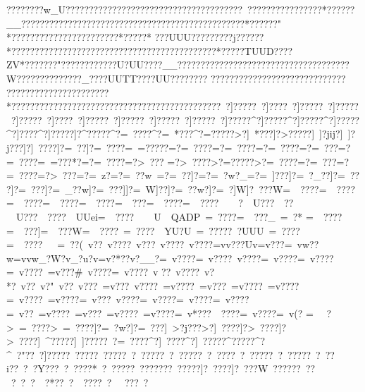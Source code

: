 {{{{{{{{{{{{{{{{{{{{{{{{{{{{{{{{{{{{{{{{{{{{{{{{{{{{{{{{{{{{{{{{{{{{{{{{{{{{{{{{{{{{{{{{{{{{{{{{{{{{{{{{{{{{{{{{{{{{{{{{{{{{{{{{{{{{{{{{{{{{{{{{{{{{{{{{{{{{{{{{{{{{{{{{{{{{{{{{{{{{{{{{{{{{{{{{{{{{{{{{{{{{{{{{{{{{{{{{{{{{{{{{{{{{{{{{{{{{{{{{{{{{{{{{{{{{{{{{{{{{{{{{{{{{{{{{{{{{{{{{{{{{{{{{{{{{{{{{{{{{{{{{{{{{{{{{{{{{{{{{{{{{{{{{{{{{{{{{{{{{{{{{{{{{{{{{{{{{{{{{{{{{{{{{{{{{{{{{{{{{{{{{{{{{{{{{{{{{{{{{{{{{{{{{{{{{{{{{{{{{{{{{{{{{{{{{{{{{{{{{{{{{{{{{{{{{{{{{{{{{{{{{{{{{{{{{{{{{{{{{{{{{{{{{{{{{{{{{{{{{{{{{{{{{{{{{{{{{{{{{{{{{{{{{{{{{{{{{{{{{{{{{{{{{{{{{{{{{{{{{{{{{{{{{{{{{{{{{{{{{{{{{{{{{{{{{{{{{{{{{{{{{{{{{{{{{{{{{{{{{{{{{{{{{{{{{{{{{{{{{{{{{{{{{{{{{{{{{{{{{{{{{{{{{{{{{{{{{{{{{{{{{{{{{{{{{{{{{{{{{{{{{{{{{{{{{{{{{{{{{{{{{{{{{{{{{{{{{{{{{{{{{{{{{{{{{{{{{{{{{{{{{{{{{{{{{{{{{{{{{{{{{{{{{{{{{{{{{{{{{{{{{{{{{{{{{{{{{{{{{{{{{{{{{{{{{{{{{{{{{{{{{{{{{{{{{{{{{{{{{{{{{{{{{{{{{{{{{{{{{{{{{{{{{{{{{{{{{{{{{{{{{{{{{{{{{{{{{{{{{{{{{{{{{{{{{{{{{{{{{{{{{{{{{{{{{{{{{{{{{{{{{{{{{{{{{{{{{{{{{{{{{{{{{{{{{{{{{{{{{{{{{{{{{{{{{{{{{{{{{{{{{{{{{{{{{{{{{{{{{{{{{{{{{{{{{{{{{{{{{{{{{{{{{{{{{{{{{{{{{{{{{{{{{{{{{{{{{{{{{{{{{{{{{{{{{{{{{{{{{{{{{{{{{{{{{{{{{{{{{{{{{{{{{{{{{{{{{{{{{{{{{{{{{{{{{{{{{{{{{{{{{{{{{{{{{{{{{{{{{{{{{{{{{{{{{{{{{????????w_U??????????????????????????????????????~????????????????*??????__????????????????????????????????????????????????*??????"
*???????????????????????*?????  *
???UUU?????????j??????
*????????????????????????????????????????????*?????TUUD????ZV*???????"????????????U?UU????__???????}??????????????????????????????W??????????????_????UUTT????UU????    ???? ????????????????????????????? ??????????????????????*?????????????????????????????????????????????~?]?????~?]????~?]?????~?]?????~?]?????~?]????~?]?????~?]?????~?]?????~?]?????~?]?????^?]?????^?]?????^?]?????^?]????^?]?????]?^?????^?=~????^?=~*???^?=?????>?]~*???]?>?????]~]?jij?]~]?j???]?]~????]?=~??]?=~????=~=?????=?=~????=?=~????=?=~????=?=~???=?=~????=~=???*?=?=~????=?>~???
=?>~????>?=?????>?=~????=?=~???=?=~????=?>~???=?=~z?=?=~??w~=?=~??]?=?=~?w?_=?=~]???]?=~?_??]?=~???]?=~???]?=~_??w]?=~???]]?=~W]??]?=~??w?]?=~?]W]?~???W=~~????=~~????=~~????=~~????=~~????=~~???=~~????=~~????~~    ~~?   ~~U???~~??  ~~U???~~????~~UUei=~~????~~    ~~U~~QADP~=~????=~~???_~=~?*
 =~~????=~~???]=~~???W=~~????~=~????~~YU?U~=~?????~?UUU~=~????=~~????~~    ~=~??(~v ?? ~v????~v???~v????~v????=vv???Uv=v???=~vw??w=vvw_?W?}v_?u?v=v?*??}v?__?=~v????=~v????~v????=~v????=~v????=~v????~=v???#~v????=~v????~v
??~v????~v?*?~v??~v?"~v??~v???~=v???~v????~=v????~=v???~=v????~=v????=~v????~=v????=~v???~v????=~v????=~v????=~v????=~v??~=v????~=v???~=v????~=v????=~v*???~~????=~v????=~v( ?
=~~
 ?>~=~????>~=~????]?=~}?w?]?=~???]~>?j???>?]~????]?>~????]?>~????]~^?????]~]?????~?=~????^?]~????^?]~????}?^?????^?^~?"??~?]?????~?}???}?~?????~?~?????~?~?????~?~????~?~?????~?~?????~?~??i??~?~?Y???~?~????*~?~?????~?}?????}?~?????]?~????]?~???W~?}?????~?}?   ~?~?    ~?~~?*??~?~~????~?~~
???~?~~ }}}}}}}}}}}}}}}}}}}}}}}}}}}}}}}}}}}}}}}}}}}}}}}}}}}}}}}}}}}}}}}}}}}}}}}}}}}}}}}}}}}}}}}}}}}}}}}}}}}}}}}}}}}}}}}}}}}}}}}}}}}}}}}}}}}}}}}}}}}}}}}}}}}}}}}}}}}}}}}}}}}}}}}}}}}}}}}}}}}}}}}}}}}}}}}}}}}}}}}}}}}}}}}}}}}}}}}}}}}}}}}}}}}}}}}}}}}}}}}}}}}}}}}}}}}}}}}}}}}}}}}}}}}}}}}}}}}}}}}}}}}}}}}}}}}}}}}}}}}}}}}}}}}}}}}}}}}}}}}}}}}}}}}}}}}}}}}}}}}}}}}}}}}}}}}}}}}}}}}}}}}}}}}}}}}}}}}}}}}}}}}}}}}}}}}}}}}}}}}}}}}}}}}}}}}}}}}}}}}}}}}}}}}}}}}}}}}}}}}}}}}}}}}}}}}}}}}}}}}}}}}}}}}}}}}}}}}}}}}}}}}}}}}}}}}}}}}}}}}}}}}}}}}}}}}}}}}}}}}}}}}}}}}}}}}}}}}}}}}}}}}}}}}}}}}}}}}}}}}}}}}}}}}}}}}}}}}}}}}}}}}}}}}}}}}}}}}}}}}}}}}}}}}}}}}}}}}}}}}}}}}}}}}}}}}}}}}}}}}}}}}}}}}}}}}}}}}}}}}}}}}}}}}}}}}}}}}}}}}}}}}}}}}}}}}}}}}}}}}}}}}}}}}}}}}}}}}}}}}}}}}}}}}}}}}}}}}}}}}}}}}}}}}}}}}}}}}}}}}}}}}}}}}}}}}}}}}}}}}}}}}}}}}}}}}}}}}}}}}}}}}}}}}}}}}}}}}}}}}}}}}}}}}}}}}}}}}}}}}}}}}}}}}}}}}}}}}}}}}}}}}}}}}}}}}}}}}}}}}}}}}}}}}}}}}}}}}}}}}}}}}}}}}}}}}}}}}}}}}}}}}}}}}}}}}}}}}}}}}}}}}}}}}}}}}}}}}}}}}}}}}}}}}}}}}}}}}}}}}}}}}}}}}}}}}}}}}}}}}}}}}}}}}}}}}}}}}}}}}}}}}}}}}}}}}}}}}}}}}}}}}}}}}}}}}}}}}}}}}}}}}}}}}}}}}}}}}}}}}}}}}}}}}}}}}}}}}}}}}}}}}}}}}}}}}}}}}}}}}}}}}}}}}}}}}}}}}}}}}}}}}}}}}}}}}}}}}}}}}}}}}}}}}}}}}}}}}}}}}}}}}}}}}}}}}}}}}}}}}}}}}}}
